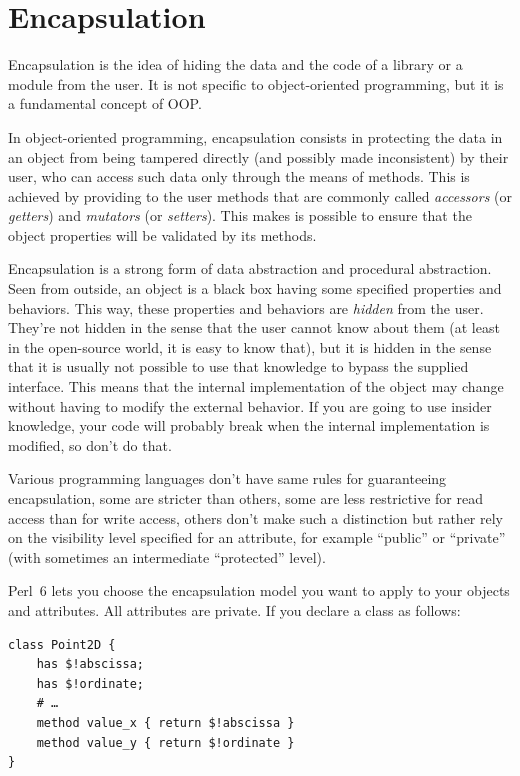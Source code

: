 \section{Encapsulation}

Encapsulation is the idea of hiding the data and the code 
of a library or a module from the user. It is not specific to 
object-oriented programming, but it is a fundamental concept 
of OOP.

In object-oriented programming, encapsulation consists in 
protecting the data in an object from being tampered 
directly (and possibly made inconsistent) 
by their user, who can access such data only through
the means of methods. This is achieved by providing to the 
user methods that are commonly called \emph{accessors} (or 
\emph{getters}) and \emph{mutators} (or \emph{setters}). This 
makes is possible to ensure that the object properties will 
be validated by its methods.

Encapsulation is a strong form of data abstraction and 
procedural abstraction. Seen from outside, an object 
is a black box having some specified properties and 
behaviors. This way, these properties and behaviors are 
\emph{hidden} from the user. They're not hidden in the 
sense that the user cannot know about them (at least in 
the open-source world, it is easy to know that), but it 
is hidden in the sense that it is usually not possible to 
use that knowledge to bypass the supplied interface. This 
means that the internal implementation of the object may 
change without having to modify the external behavior. If you 
are going to use insider knowledge, your code will 
probably break when the internal implementation is 
modified, so don't do that.

Various programming languages don't have same rules for 
guaranteeing encapsulation, some are stricter than others, 
some are less restrictive for read access than for write access, 
others don't make such a distinction but rather rely on the 
visibility level specified for an attribute, for example 
``public'' or ``private'' (with sometimes an intermediate 
``protected'' level).

Perl~6 lets you choose the encapsulation model you want to 
apply to your objects and attributes. All attributes are 
private. If you declare a class as follows:

\begin{verbatim}
class Point2D {
    has $!abscissa;
    has $!ordinate;
    # …
    method value_x { return $!abscissa }
    method value_y { return $!ordinate }
}
\end{verbatim}

